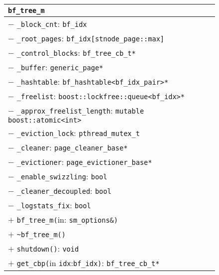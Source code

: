 \begin{@empty}
	\begin{figure}[ht!]
		\centering
		\scriptsize
		\setlength{\fboxsep}{0pt}
		\colorbox{listingsbackground}{\begin{tabularx}{\textwidth}{|X|}
			\hline
			\texttt{\textbf{bf\_tree\_m}}																																	\\	\hline
			$-$ \texttt{\_block\_cnt}: \texttt{bf\_idx}																														\\
			$-$ \texttt{\_root\_pages}: \texttt{bf\_idx[stnode\_page::max]}																										\\
			$-$ \texttt{\_control\_blocks}: \texttt{bf\_tree\_cb\_t*}																												\\
			$-$ \texttt{\_buffer}: \texttt{generic\_page*}																														\\
			$-$ \texttt{\_hashtable}: \texttt{bf\_hashtable<bf\_idx\_pair>*}																										\\
			$-$ \texttt{\_freelist}: \texttt{boost::lockfree::queue<bf\_idx>*}																										\\
			$-$ \texttt{\_approx\_freelist\_length}: \texttt{mutable boost::atomic<int>}																								\\
			$-$ \texttt{\_eviction\_lock}: \texttt{pthread\_mutex\_t}																											\\
			$-$ \texttt{\_cleaner}: \texttt{page\_cleaner\_base*}																												\\
			$-$ \texttt{\_evictioner}: \texttt{page\_evictioner\_base*}																											\\
			$-$ \texttt{\_enable\_swizzling}: \texttt{bool}																													\\
			$-$ \texttt{\_cleaner\_decoupled}: \texttt{bool}																													\\
			$-$ \texttt{\_logstats\_fix}: \texttt{bool}																														\\	\hline
			$+$ \texttt{bf\_tree\_m(}in: \texttt{sm\_options\&)}																												\\
			$+$ \texttt{\textasciitilde bf\_tree\_m()}																														\\
			$+$ \texttt{shutdown()}: \texttt{void}																															\\
			$+$ \texttt{get\_cbp(}in \texttt{idx}:\texttt{bf\_idx)}: \texttt{bf\_tree\_cb\_t*}																								\\

\end{tabularx}}
\end{figure}
\end{@empty}

